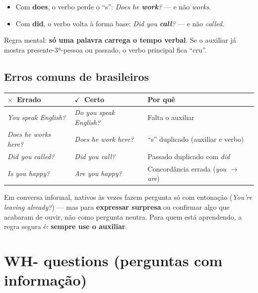 \documentclass[12pt,a4paper,oneside]{book}
\newcommand{\en}[1]{\textit{#1}}                 %
\newcommand{\aux}[1]{\textbf{\textcolor{blue!60!black}{#1}}} %
\newcommand{\ok}{\textcolor{green!45!black}{$\checkmark$}}
\newcommand{\no}{\textcolor{red!70!black}{$\times$}}
\begin{document}
\begin{cuidado}
\begin{itemize}
  \item Com \aux{does}, o verbo perde o ``s'': \en{Does he \textbf{work}?} --- e não \en{works}.
  \item Com \aux{did}, o verbo volta à forma base: \en{Did you \textbf{call}?} --- e não \en{called}.
\end{itemize}
Regra mental: \textbf{só uma palavra carrega o tempo verbal}. Se o auxiliar já mostra presente-3ª-pessoa ou passado, o verbo principal fica ``cru''.
\end{cuidado}

\subsection{Erros comuns de brasileiros}

\begin{center}
\begin{tabularx}{\textwidth}{@{}llX@{}}
\toprule
\textbf{\no\ Errado} & \textbf{\ok\ Certo} & \textbf{Por quê} \\
\midrule
\en{You speak English?} & \en{Do you speak English?} & Falta o auxiliar \\
\en{Does he works here?} & \en{Does he work here?} & ``s'' duplicado (auxiliar e verbo) \\
\en{Did you called?} & \en{Did you call?} & Passado duplicado com \en{did} \\
\en{Is you happy?} & \en{Are you happy?} & Concordância errada (\en{you} $\to$ \en{are}) \\
\bottomrule
\end{tabularx}
\end{center}

\begin{nota}
Em conversa informal, nativos às vezes fazem pergunta só com entonação (\en{You're leaving already?}) --- mas para \textbf{expressar surpresa} ou confirmar algo que acabaram de ouvir, não como pergunta neutra. Para quem está aprendendo, a regra segura é: \textbf{sempre use o auxiliar}.
\end{nota}

\section{WH- questions (perguntas com informação)}
\end{document}
